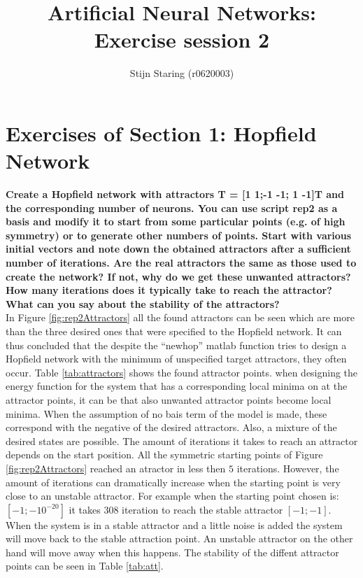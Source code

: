 \documentclass[a4paper,10pt]{article}
\title{Artificial Neural Networks: Exercise session 2}
\author{Stijn Staring (r0620003)}
\begin{document}
\selectfont{}

\maketitle


\section{Exercises of Section 1: Hopfield Network}
\textbf{Create a Hopfield network with attractors T = [1 1;-1  -1; 1 -1]T and the corresponding number of neurons. You
	can use script rep2 as a basis and modify it to start from some particular points (e.g. of high symmetry) or to generate
	other numbers of points. Start with various initial vectors and note down the obtained attractors after a sufficient number
	of iterations. Are the real attractors the same as those used to create the network? If not, why do we get these unwanted
	attractors? How many iterations does it typically take to reach the attractor? What can you say about the stability of the
	attractors?}\\

In Figure \ref{fig:rep2Attractors} all the found attractors can be seen which are more than the three desired ones that were specified to the Hopfield network. It can thus concluded that the despite the ``newhop'' matlab function tries to design a Hopfield network with the minimum of unspecified target attractors, they often occur. Table \ref{tab:attractors} shows the found attractor points. when designing the energy function for the system that has a corresponding local minima on at the attractor points, it can be that also unwanted attractor points become local minima. When the assumption of no bais term of the model is made, these correspond with the negative of the desired attractors. Also, a mixture of the desired states are possible. The amount of iterations it takes to reach an attractor depends on the start position. All the symmetric starting points of Figure \ref{fig:rep2Attractors} reached an atractor in less then $ 5 $ iterations. However, the amount of iterations can dramatically increase when the starting point is very close to an unstable attractor. For example when the starting point chosen is: $ [-1;-10^{-20}] $ it takes $ 308 $ iteration to reach the stable attractor $ [-1;-1] $. When the system is in a stable attractor and a little noise is added the system will move back to the stable attraction point. An unstable attractor on the other hand will move away when this happens. The stability of the diffent attractor points can be seen in Table \ref{tab:att}.
\end{document}
